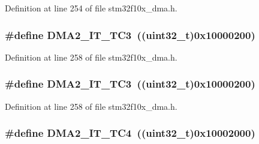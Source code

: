 Definition at line 254 of file stm32f10x\+\_\+dma.\+h.

\subsubsection[{\texorpdfstring{D\+M\+A2\+\_\+\+I\+T\+\_\+\+T\+C3}{DMA2_IT_TC3}}]{\setlength{\rightskip}{0pt plus 5cm}\#define D\+M\+A2\+\_\+\+I\+T\+\_\+\+T\+C3~(({\bf uint32\+\_\+t})0x10000200)}\hypertarget{group___d_m_a__interrupts__definition_ga249abc1068e8979f52d7d867b5de5a75}{}\label{group___d_m_a__interrupts__definition_ga249abc1068e8979f52d7d867b5de5a75}


Definition at line 258 of file stm32f10x\+\_\+dma.\+h.

\subsubsection[{\texorpdfstring{D\+M\+A2\+\_\+\+I\+T\+\_\+\+T\+C3}{DMA2_IT_TC3}}]{\setlength{\rightskip}{0pt plus 5cm}\#define D\+M\+A2\+\_\+\+I\+T\+\_\+\+T\+C3~(({\bf uint32\+\_\+t})0x10000200)}\hypertarget{group___d_m_a__interrupts__definition_ga249abc1068e8979f52d7d867b5de5a75}{}\label{group___d_m_a__interrupts__definition_ga249abc1068e8979f52d7d867b5de5a75}


Definition at line 258 of file stm32f10x\+\_\+dma.\+h.

\subsubsection[{\texorpdfstring{D\+M\+A2\+\_\+\+I\+T\+\_\+\+T\+C4}{DMA2_IT_TC4}}]{\setlength{\rightskip}{0pt plus 5cm}\#define D\+M\+A2\+\_\+\+I\+T\+\_\+\+T\+C4~(({\bf uint32\+\_\+t})0x10002000)}\hypertarget{group___d_m_a__interrupts__definition_ga54b6716e82894f76c87926afe2a65f30}{}\label{group___d_m_a__interrupts__definition_ga54b6716e82894f76c87926afe2a65f30}


